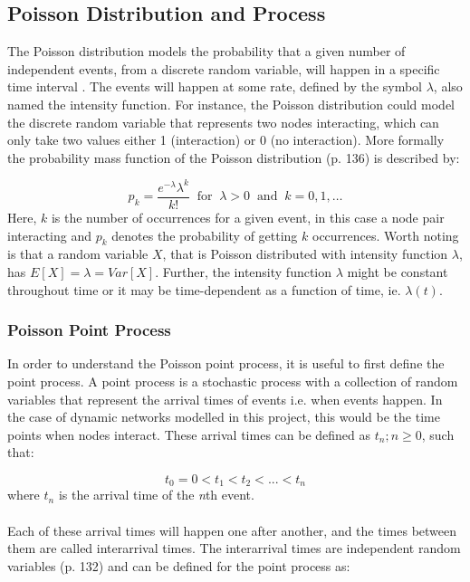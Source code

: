 \subsection{Poisson Distribution and Process}
\label{sec:Method:Poisson}
The Poisson distribution models the probability that a given number of independent events, from a discrete random variable, will happen in a specific time interval \cite{PoissonScience}. 
The events will happen at some rate, defined by the symbol $\lambda$, also named the intensity function. 
For instance, the Poisson distribution could model the discrete random variable that represents two nodes interacting, which can only take two values either 1 (interaction) or 0 (no interaction).
More formally the probability mass function of the Poisson distribution \cite{Bas2019AProcess} (p. 136) is described by:

\begin{equation}
    p_k = \frac{e^{-\lambda}\lambda^k}{k!} \;\; \text{for} \;\; \lambda > 0 \;\; \text{and} \;\; k = 0,1,\dots
\end{equation}
Here, $k$ is the number of occurrences for a given event, in this case a node pair interacting and $p_k$ denotes the probability of getting $k$ occurrences.
Worth noting is that a random variable $X$, that is Poisson distributed with intensity function $\lambda$, has $E[X] = \lambda = Var[X]$.
Further, the intensity function $\lambda$ might be constant throughout time or it may be time-dependent as a function of time, ie. $\lambda(t)$.


\subsubsection{Poisson Point Process}
\label{sec:Method:Poisson:PoissonPointProcess}
In order to understand the Poisson point process, it is useful to first define the point process. 
A point process is a stochastic process with a collection of random variables that represent the arrival times of events i.e. when events happen. 
In the case of dynamic networks modelled in this project, this would be the time points when nodes interact. 
These arrival times can be defined as ${t_n ; n \ge 0}$, such that:

$$
t_0 = 0 < t_1 < t_2 < ... < t_n
$$
where $t_n$ is the arrival time of the \textit{n}th event.
\\\\
Each of these arrival times will happen one after another, and the times between them are called interarrival times. 
The interarrival times are independent random variables \cite{Bas2019AProcess} (p. 132) and can be defined for the point process as:


